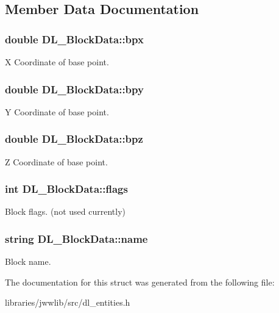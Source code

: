 \subsection{Member Data Documentation}
\hypertarget{structDL__BlockData_aaf0007a77910f48d0ddc68c87cf32954}{
\subsubsection[{bpx}]{\setlength{\rightskip}{0pt plus 5cm}double D\-L\-\_\-\-Block\-Data\-::bpx}}\label{structDL__BlockData_aaf0007a77910f48d0ddc68c87cf32954}
X Coordinate of base point. \hypertarget{structDL__BlockData_ad535616da7e489d8169675d17e27ea3a}{
\subsubsection[{bpy}]{\setlength{\rightskip}{0pt plus 5cm}double D\-L\-\_\-\-Block\-Data\-::bpy}}\label{structDL__BlockData_ad535616da7e489d8169675d17e27ea3a}
Y Coordinate of base point. \hypertarget{structDL__BlockData_a2d68f5c359af30ce008a5c60999745cc}{
\subsubsection[{bpz}]{\setlength{\rightskip}{0pt plus 5cm}double D\-L\-\_\-\-Block\-Data\-::bpz}}\label{structDL__BlockData_a2d68f5c359af30ce008a5c60999745cc}
Z Coordinate of base point. \hypertarget{structDL__BlockData_a659ccdb0d78310e9a7aa1d254165d157}{
\subsubsection[{flags}]{\setlength{\rightskip}{0pt plus 5cm}int D\-L\-\_\-\-Block\-Data\-::flags}}\label{structDL__BlockData_a659ccdb0d78310e9a7aa1d254165d157}
Block flags. (not used currently) \hypertarget{structDL__BlockData_aaaee8da19181420398d6989c08be6d22}{
\subsubsection[{name}]{\setlength{\rightskip}{0pt plus 5cm}string D\-L\-\_\-\-Block\-Data\-::name}}\label{structDL__BlockData_aaaee8da19181420398d6989c08be6d22}
Block name. 

The documentation for this struct was generated from the following file\-:\begin{DoxyCompactItemize}
\item 
libraries/jwwlib/src/dl\-\_\-entities.\-h\end{DoxyCompactItemize}
